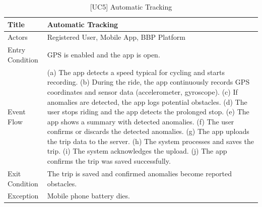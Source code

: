 \begin{table}[H]
    \centering
    \begin{tabular}{|p{4cm}|p{10cm}|}
        \hline
        Title & \textbf{Automatic Tracking} \\
        \hline
        Actors & Registered User, Mobile App, BBP Platform \\
        \hline
        Entry Condition & GPS is enabled and the app is open. \\
        \hline
        Event Flow & 
        (a) The app detects a speed typical for cycling and starts recording. \newline
        (b) During the ride, the app continuously records GPS coordinates and sensor data (accelerometer, gyroscope). \newline
        (c) If anomalies are detected, the app logs potential obstacles. \newline
        (d) The user stops riding and the app detects the prolonged stop. \newline
        (e) The app shows a summary with detected anomalies. \newline
        (f) The user confirms or discards the detected anomalies. \newline
        (g) The app uploads the trip data to the server. \newline
        (h) The system processes and saves the trip. \newline
        (i) The system acknowledges the upload. \newline
        (j) The app confirms the trip was saved successfully. \\
        \hline
        Exit Condition & The trip is saved and confirmed anomalies become reported obstacles. \\
        \hline
        Exception & Mobile phone battery dies. \\
        \hline
    \end{tabular}
    \caption{[UC5] Automatic Tracking}
    \label{tab:uc5}
\end{table}

